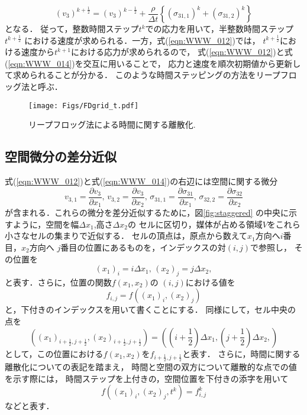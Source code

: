 \begin{equation}
	(v_3)^{k+\frac{1}{2}} = (v_3)^{k-\frac{1}{2}}
	+
	\frac{\rho}{\Delta t} \left\{
	(\sigma_{31,1})^{k} + (\sigma_{31,2})^{k}
	\right\} 
	\label{eqn:WWW_014}
\end{equation}
となる．
従って，整数時間ステップ$t^k$での応力を用いて，半整数時間ステップ$t^{k+\frac{1}{2}}$
における速度が求められる．一方，式(\ref{eqn:WWW_012})では，
$t^{k+\frac{1}{2}}$における速度から$t^{k+1}$における応力が求められるので，
式(\ref{eqn:WWW_012})と式(\ref{eqn:WWW_014})を交互に用いることで，
応力と速度を順次初期値から更新して求められることが分かる．
このような時間ステッピングの方法をリープフロッグ法と呼ぶ．
\begin{figure}[h]
	\begin{center}
	\texttt{[image: Figs/FDgrid\_t.pdf]} 
	\end{center}
	\caption{リープフロッグ法による時間に関する離散化.} 
	\label{fig:leapfrog}
\end{figure}
\subsection{空間微分の差分近似}
式(\ref{eqn:WWW_012})と式(\ref{eqn:WWW_014})の右辺には空間に関する微分
\[
	v_{3,1}=\frac{\partial v_3}{\partial x_1},\,
	v_{3,2}=\frac{\partial v_3}{\partial x_2}, \,
	\sigma_{31,1}=\frac{\partial \sigma_{31}}{\partial x_1},\,
	\sigma_{32,2}=\frac{\partial \sigma_{32}}{\partial x_2}
\]
が含まれる．これらの微分を差分近似するために，図\ref{fig:staggered}
の中央に示すように，空間を幅$\Delta x_1$,高さ$\Delta x_2$の
セルに区切り，媒体が占める領域$V$をこれら小さなセルの集まりで近似する．
セルの頂点は，原点から数えて$x_1$方向へ$i$番目，$x_2$方向へ
$j$番目の位置にあるものを，インデックスの対$(i,j)$で参照し，
その位置を
\[
	(x_1)_i=i\Delta x_1, \, (x_2)_j=j\Delta x_2, 
\]
と表す．さらに，位置の関数$f(x_1, x_2)$の
$(i,j)$における値を
\[
	f_{i,j}=f\left((x_1)_i, (x_2)_j\right)
\]
と，下付きのインデックスを用いて書くことにする．
同様にして，セル中央の点を
\[
	\left( 
	(x_1)_{i+\frac{1}{2},j+\frac{1}{2}}, (x_2)_{i+\frac{1}{2},j+\frac{1}{2}}
	\right)
	=
	\left(
	\left(i+\frac{1}{2} \right)\Delta x_1, 
	\left(j+\frac{1}{2} \right)\Delta x_2, 
	\right)
\]
として，この位置における$f(x_1,x_2)$を$f_{i+\frac{1}{2},j+\frac{1}{2}}$と表す．
さらに，時間に関する離散化についての表記を踏まえ，
時間と空間の双方について離散的な点での値を示す際には，
時間ステップを上付きの，空間位置を下付きの添字を用いて
\[
	f\left((x_1)_i,(x_2)_j,t^k\right) =f^k_{i,j}
\]
などと表す．

